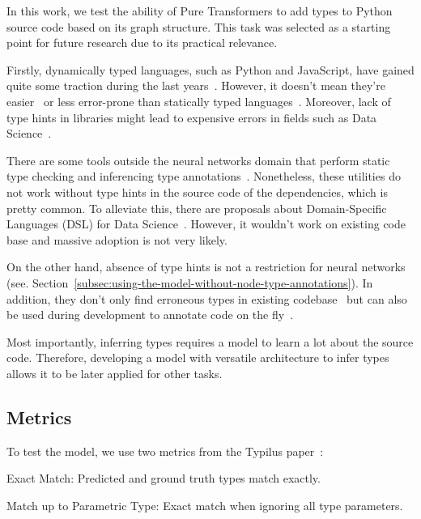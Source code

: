 In this work, we test the ability of Pure Transformers to add types to Python source code based on its graph structure.
This task was selected as a starting point for future research due to its practical relevance.

Firstly, dynamically typed languages, such as Python and JavaScript, have gained quite some traction during the last years~\cite{kaggle-survey-2021}.
However, it doesn't mean they're easier~\cite{robillard2009what, robillard2011afield, zibran2011useful} or less error-prone than statically typed languages~\cite{alzahrani2018pythonvscplus}.
Moreover, lack of type hints in libraries might lead to expensive errors in fields such as Data Science~\cite{reimann2023safeds}.

There are some tools outside the neural networks domain that perform static type checking and inferencing type annotations~\cite{pyre, PyType}.
Nonetheless, these utilities do not work without type hints in the source code of the dependencies, which is pretty common.
To alleviate this, there are proposals about Domain-Specific Languages (DSL) for Data Science~\cite{reimann2023safeds}.
However, it wouldn't work on existing code base and massive adoption is not very likely.

On the other hand, absence of type hints is not a restriction for neural networks
(see. Section~\ref{subsec:using-the-model-without-node-type-annotations}).
In addition, they don't only find erroneous types in existing codebase~\cite{allamanis2020typilus}
but can also be used during development to annotate code on the fly~\cite{mir_type4py_2021}.

Most importantly, inferring types requires a model to learn a lot about the source code.
Therefore, developing a model with versatile architecture to infer types allows it to be later applied for other tasks.

\subsection{Metrics}\label{subsec:metrics}

To test the model, we use two metrics from the Typilus paper~\cite{allamanis2020typilus}:

\begin{description}
    \item{Exact Match: Predicted and ground truth types match exactly.}
    \item{Match up to Parametric Type: Exact match when ignoring all type parameters.}
\end{description}